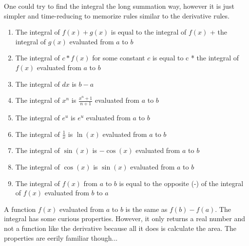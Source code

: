\documentclass[../revisedmain.tex]{subfiles}
\begin{document}
One could try to find the integral the long summation way, however it is just simpler and time-reducing to memorize rules similar to the derivative rules.
\begin{enumerate}
	\item The integral of $f(x)+g(x)$ is equal to the integral of $f(x)$ + the integral of $g(x)$ evaluated from $a$ to $b$
	\item The integral of $c*f(x)$ for some constant $c$ is equal to c * the integral of $f(x)$ evaluated from $a$ to $b$
	\item The integral of $dx$ is $b-a$
	\item The integral of $x^n$ is $\displaystyle\frac{x^n+1}{n+1}$ evaluated from $a$ to $b$
	\item The integral of $e^u$ is $e^u$ evaluated from $a$ to $b$
	\item The integral of $\displaystyle\frac{1}{x}$ is $\ln(x)$ evaluated from $a$ to $b$
	\item The integral of $\sin(x)$ is $-\cos(x)$ evaluated from $a$ to $b$
	\item The integral of $\cos(x)$ is $\sin(x)$ evaluated from $a$ to $b$
	\item The integral of $f(x)$ from $a$ to $b$ is equal to the opposite (-) of the integral of $f(x)$ evaluated from $b$ to $a$
\end{enumerate}
A function $f(x)$ evaluated from $a$ to $b$ is the same as $f(b)-f(a)$. The integral has some curious properties. However, it only returns a real number and not a function like the derivative because all it does is calculate the area.	The properties are eerily familiar though...
\end{document}
